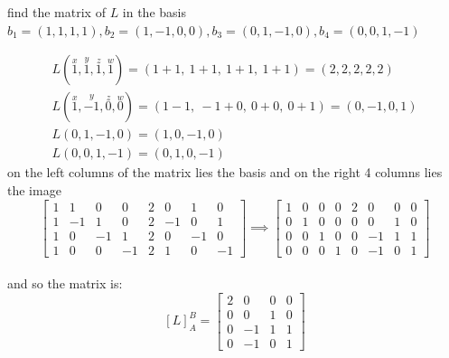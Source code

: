 \documentclass[a4paper,12pt]{article}
\begin{document}
\begin{definition}
\begin{question}
\begin{subquestion}
find the matrix of \(L\) in the basis \(b_1=(1,1,1,1),b_2=(1,-1,0,0),b_3=(0,1,-1,0),b_4=(0,0,1,-1)\)\\
\begin{answer}
\begin{gather*}
  L(\stackrel{x}{1},\stackrel{y}{1},\stackrel{z}{1},\stackrel{w}{1}) = (1+1,\ 1+1,\ 1+1,\ 1+1) = (2,2,2,2,2)\\
  L(\stackrel{x}{1},\stackrel{y}{-1},\stackrel{z}{0},\stackrel{w}{0}) = (1-1,\ -1+0,\ 0+0,\ 0+1) = (0,-1,0,1)\\
  L(0,1,-1,0) = (1,0,-1,0)\\
  L(0,0,1,-1) = (0,1,0,-1)
\end{gather*}
on the left columns of the matrix lies the basis and on the right 4 columns lies the image\\
\[\left[\begin{array}{rrrrrrrr} 1 & 1 & 0 & 0 & 2 & 0 & 1 & 0 \\ 1 & -1 & 1 & 0 & 2 & -1 & 0 & 1 \\ 1 & 0 & -1 & 1 & 2 & 0 & -1 & 0 \\ 1 & 0 & 0 & -1 & 2 & 1 & 0 & -1 \end{array}\right] \implies \left[\begin{array}{rrrrrrrr} 1 & 0 & 0 & 0 & 2 & 0 & 0 & 0 \\ 0 & 1 & 0 & 0 & 0 & 0 & 1 & 0 \\ 0 & 0 & 1 & 0 & 0 & -1 & 1 & 1 \\ 0 & 0 & 0 & 1 & 0 & -1 & 0 & 1 \end{array}\right]\]\\
and so the matrix is:\\
\[[L]_A^B = \left[\begin{array}{rrrr} 2 & 0 & 0 & 0 \\ 0 & 0 & 1 & 0 \\ 0 & -1 & 1 & 1 \\ 0 & -1 & 0 & 1 \end{array}\right]\]\\
\end{answer}
\end{subquestion}


\end{question}
\end{definition}
\end{document}
